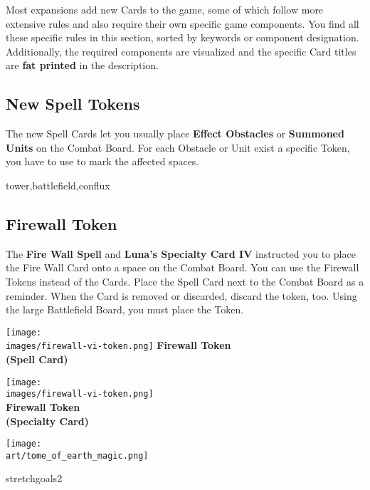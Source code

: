 

Most expansions add new Cards to the game, some of which follow more extensive rules and also require their own specific game components.
You find all these specific rules in this section, sorted by keywords or component designation. Additionally, the required components are visualized and the specific Card titles are \textbf{fat printed} in the description.

\begin{multicols}{2}

\subsection*{New Spell Tokens}
The new Spell Cards let you usually place \textbf{Effect Obstacles} or \textbf{Summoned Units} on the Combat Board. For each Obstacle or Unit exist a specific Token, you have to use to mark the affected spaces.

\begin{expansion}{tower,battlefield,conflux}
    \subsection*{Firewall Token}
    The \textbf{Fire Wall Spell} and \textbf{Luna's Specialty Card IV} instructed you to place the Fire Wall Card onto a space on the Combat Board.
    You can use the Firewall Tokens instead of the Cards.
    Place the Spell Card next to the Combat Board as a reminder.
    When the Card is removed or discarded, discard the token, too.
    Using the large Battlefield Board, you must place the Token.
    \begin{multicols}{2}
        \centering
        \texttt{[image: \\images/firewall-vi-token.png]}
        \textbf{\scriptsize\color{darkcandyapplered}Firewall Token\\ (Spell Card)}

        \columnbreak
        \texttt{[image: \\images/firewall-vi-token.png]}\\
        \textbf{\scriptsize\color{darkcandyapplered}Firewall Token\\ (Specialty Card)}
    \end{multicols}
\end{expansion}

\begin{center}
    \texttt{[image: \\art/tome\_of\_earth\_magic.png]}
\end{center}
\columnbreak
\begin{expansion}{stretchgoals2}

\end{expansion}
\end{multicols}

